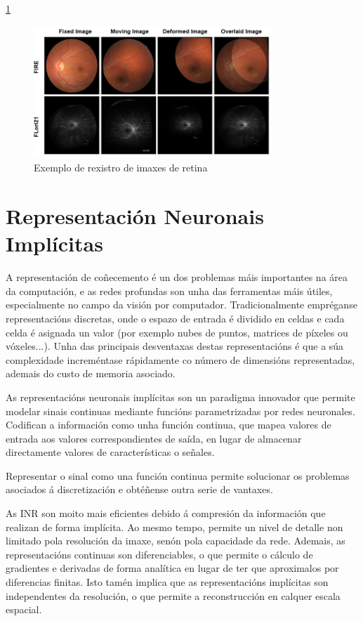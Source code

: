 \ref{fig:retin_reg}
\begin{figure}[hp!]
    \centering
    \includegraphics[width=0.8\textwidth]{imaxes/retin-reg.png}
    \caption{Exemplo de rexistro de imaxes de retina \cite{sivaraman2024retinaregnetzeroshotapproachretinal}}
    \label{fig:retin_reg}
\end{figure}


\section{Representación Neuronais Implícitas}
\label{sec:Representación Neuronais Implícitas}
 
A representación de coñecemento é un dos problemas máis importantes na área da computación, e as 
redes profundas son unha das ferramentas máis útiles, especialmente no campo da visión por computador.
Tradicionalmente empréganse representacións discretas, onde o espazo de entrada é dividido en celdas e cada celda é asignada un valor (por exemplo nubes de puntos, matrices de píxeles ou vóxeles...).
Unha das principais desventaxas destas representacións é que a súa complexidade increméntase rápidamente co número de dimensións representadas, ademais do custo de memoria asociado.

 As representacións neuronais implícitas son un paradigma innovador que permite modelar sinais continuas mediante funcións parametrizadas por redes neuronales.
 Codifican a información como unha función continua, que mapea valores de entrada aos valores correspondientes de saída, en lugar de almacenar directamente valores de características o señales.

Representar o sinal como una función continua permite solucionar os problemas asociados á discretización e obtéñense outra serie de vantaxes.

As INR son moito mais eficientes debido á compresión da información que realizan de forma implícita. Ao mesmo tempo, permite un nivel de detalle non limitado pola resolución da imaxe, senón pola capacidade da rede. 
 Ademais, as representacións continuas son diferenciables, o que permite o cálculo de gradientes e derivadas de forma analítica en lugar de ter que aproximalos por diferencias finitas.
 Isto tamén implica que as representacións implícitas son independentes da resolución, o que permite a reconstrucción en calquer escala espacial.
 
